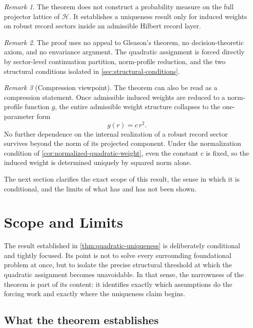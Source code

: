 \documentclass[11pt]{article}
\theoremstyle{remark}
\newtheorem{remark}{Remark}
\numberwithin{equation}{section}
\newcommand{\HH}{\mathcal{H}}
\begin{document}
\begin{remark}
The theorem does not construct a probability measure on the full projector lattice of \(\HH\). It establishes a uniqueness result only for induced weights on robust record sectors inside an admissible Hilbert record layer.
\end{remark}

\begin{remark}
The proof uses no appeal to Gleason's theorem, no decision-theoretic axiom, and no envariance argument. The quadratic assignment is forced directly by sector-level continuation partition, norm-profile reduction, and the two structural conditions isolated in \cref{sec:structural-conditions}.
\end{remark}

\begin{remark}[Compression viewpoint]
The theorem can also be read as a compression statement. Once admissible induced weights are reduced to a norm-profile function $g$, the entire admissible weight structure collapses to the one-parameter form
\[
  g(r) = c\,r^2.
\]
No further dependence on the internal realization of a robust record sector survives beyond the norm of its projected component. Under the normalization condition of \cref{cor:normalized-quadratic-weight}, even the constant $c$ is fixed, so the induced weight is determined uniquely by squared norm alone.
\end{remark}

The next section clarifies the exact scope of this result, the sense in which it is conditional, and the limits of what has and has not been shown.

\section{Scope and Limits}
\label{sec:scope-limits}

The result established in \cref{thm:quadratic-uniqueness} is deliberately conditional and tightly focused. Its point is not to solve every surrounding foundational problem at once, but to isolate the precise structural threshold at which the quadratic assignment becomes unavoidable. In that sense, the narrowness of the theorem is part of its content: it identifies exactly which assumptions do the forcing work and exactly where the uniqueness claim begins.

\subsection{What the theorem establishes}
\end{document}
